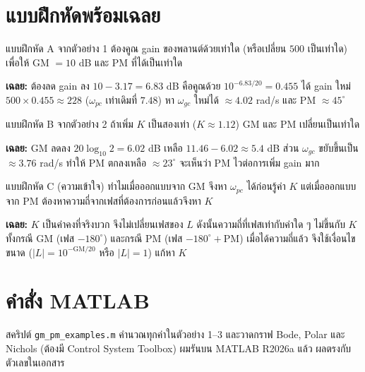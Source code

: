 \documentclass[12pt,a4paper]{article}
\begin{document}
\section{แบบฝึกหัดพร้อมเฉลย}
\begin{exbox}{แบบฝึกหัด A}
จากตัวอย่าง 1 ต้องคูณ gain ของพลานต์ด้วยเท่าใด (หรือเปลี่ยน $500$ เป็นเท่าใด) เพื่อให้ GM $=10$ dB และ PM ที่ได้เป็นเท่าใด
\end{exbox}
\textbf{เฉลย:} ต้องลด gain ลง $10-3.17=6.83$ dB คือคูณด้วย $10^{-6.83/20}=0.455$ ได้ gain ใหม่ $500\times0.455\approx228$ ($\omega_{pc}$ เท่าเดิมที่ $7.48$) หา $\omega_{gc}$ ใหม่ได้ $\approx4.02$ rad/s และ PM $\approx45^\circ$

\begin{exbox}{แบบฝึกหัด B}
จากตัวอย่าง 2 ถ้าเพิ่ม $K$ เป็นสองเท่า ($K\approx1.12$) GM และ PM เปลี่ยนเป็นเท่าใด
\end{exbox}
\textbf{เฉลย:} GM ลดลง $20\log_{10}2=6.02$ dB เหลือ $11.46-6.02\approx5.4$ dB ส่วน $\omega_{gc}$ ขยับขึ้นเป็น $\approx3.76$ rad/s ทำให้ PM ตกลงเหลือ $\approx23^\circ$ จะเห็นว่า PM ไวต่อการเพิ่ม gain มาก

\begin{exbox}{แบบฝึกหัด C (ความเข้าใจ)}
ทำไมเมื่อออกแบบจาก GM จึงหา $\omega_{pc}$ ได้ก่อนรู้ค่า $K$ แต่เมื่อออกแบบจาก PM ต้องหาความถี่จากเฟสที่ต้องการก่อนแล้วจึงหา $K$
\end{exbox}
\textbf{เฉลย:} $K$ เป็นค่าคงที่จริงบวก จึงไม่เปลี่ยนเฟสของ $L$ ดังนั้นความถี่ที่เฟสเท่ากับค่าใด ๆ ไม่ขึ้นกับ $K$ ทั้งกรณี GM (เฟส $-180^\circ$) และกรณี PM (เฟส $-180^\circ+\mathrm{PM}$) เมื่อได้ความถี่แล้ว จึงใช้เงื่อนไขขนาด ($|L|=10^{-\mathrm{GM}/20}$ หรือ $|L|=1$) แก้หา $K$

\section{คำสั่ง MATLAB}
สคริปต์ \texttt{gm\_pm\_examples.m} คำนวณทุกค่าในตัวอย่าง 1--3 และวาดกราฟ Bode, Polar และ Nichols (ต้องมี Control System Toolbox) ผมรันบน MATLAB R2026a แล้ว ผลตรงกับตัวเลขในเอกสาร
\end{document}
